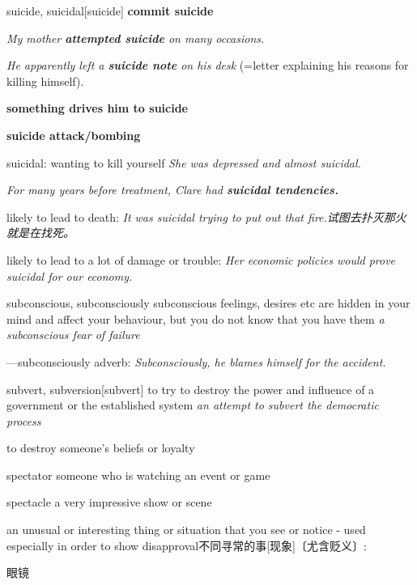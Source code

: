 \begin{DefWord}{suicide, suicidal}[suicide]
    \textbf{commit suicide}

    \textit{My mother \textbf{attempted suicide} on many occasions.}

    \textit{He apparently left a \textbf{suicide note} on his desk} (=letter explaining his reasons for killing himself).

    \textbf{something drives him to suicide}

    \textbf{suicide attack/bombing}

    suicidal: 
    wanting to kill yourself
    \textit{She was depressed and almost suicidal.}

    \textit{For many years before treatment, Clare had \textbf{suicidal tendencies.}}

    likely to lead to death:
    \textit{It was suicidal trying to put out that fire.试图去扑灭那火就是在找死。 }

    likely to lead to a lot of damage or trouble: 
    \textit{Her economic policies would prove suicidal for our economy.}
\end{DefWord}

\begin{DefWord}{subconscious, subconsciously}
    subconscious feelings, desires etc are hidden in your mind and affect your behaviour, but you do not know that you have them
    \textit{a subconscious fear of failure}

    —subconsciously adverb:
    \textit{Subconsciously, he blames himself for the accident.}
\end{DefWord}

\begin{DefWord}{subvert, subversion}[subvert]
    to try to destroy the power and influence of a government or the established system
    \textit{an attempt to subvert the democratic process}

    to destroy someone's beliefs or loyalty
\end{DefWord}

\begin{DefWord}{spectator}
    someone who is watching an event or game


\end{DefWord}

\begin{DefWord}{spectacle}
    a very impressive show or scene

    an unusual or interesting thing or situation that you see or notice - used especially in order to show disapproval不同寻常的事[现象]〔尤含贬义〕:

    眼镜
\end{DefWord}

